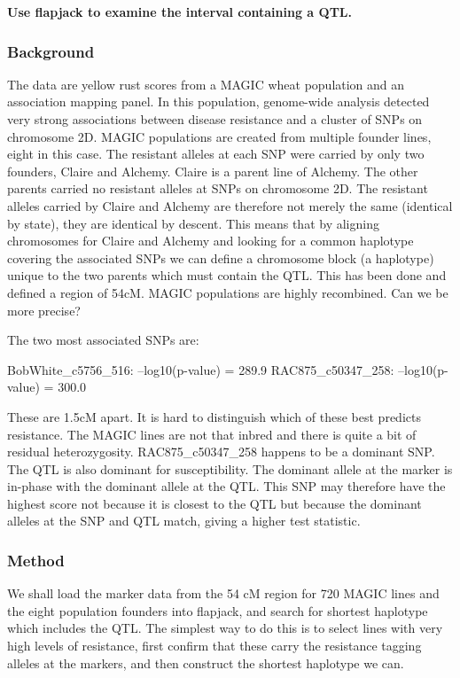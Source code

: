 \documentclass[
]{book}
\begin{document}
\textbf{Use flapjack to examine the interval containing a QTL.}

\hypertarget{background}{%
\subsubsection{Background}\label{background}}

The data are yellow rust scores from a MAGIC wheat population and an association mapping panel. In this population, genome-wide analysis detected very strong associations between disease resistance and a cluster of SNPs on chromosome 2D. MAGIC populations are created from multiple founder lines, eight in this case. The resistant alleles at each SNP were carried by only two founders, Claire and Alchemy. Claire is a parent line of Alchemy. The other parents carried no resistant alleles at SNPs on chromosome 2D. The resistant alleles carried by Claire and Alchemy are therefore not merely the same (identical by state), they are identical by descent. This means that by aligning chromosomes for Claire and Alchemy and looking for a common haplotype covering the associated SNPs we can define a chromosome block (a haplotype) unique to the two parents which must contain the QTL. This has been done and defined a region of 54cM. MAGIC populations are highly recombined. Can we be more precise?

The two most associated SNPs are:

BobWhite\_c5756\_516: --log10(p-value) = 289.9
RAC875\_c50347\_258: --log10(p-value) = 300.0

These are 1.5cM apart. It is hard to distinguish which of these best predicts resistance. The MAGIC lines are not that inbred and there is quite a bit of residual heterozygosity. RAC875\_c50347\_258 happens to be a dominant SNP. The QTL is also dominant for susceptibility. The dominant allele at the marker is in-phase with the dominant allele at the QTL. This SNP may therefore have the highest score not because it is closest to the QTL but because the dominant alleles at the SNP and QTL match, giving a higher test statistic.

\hypertarget{method}{%
\subsubsection{Method}\label{method}}

We shall load the marker data from the 54 cM region for 720 MAGIC lines and the eight population founders into flapjack, and search for shortest haplotype which includes the QTL. The simplest way to do this is to select lines with very high levels of resistance, first confirm that these carry the resistance tagging alleles at the markers, and then construct the shortest haplotype we can.
\end{document}
